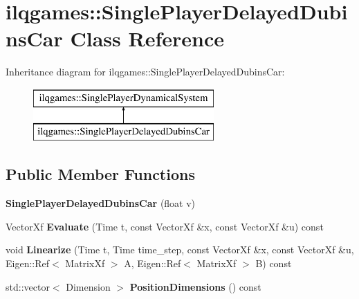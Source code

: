 \hypertarget{classilqgames_1_1_single_player_delayed_dubins_car}{}\section{ilqgames\+:\+:Single\+Player\+Delayed\+Dubins\+Car Class Reference}
\label{classilqgames_1_1_single_player_delayed_dubins_car}
Inheritance diagram for ilqgames\+:\+:Single\+Player\+Delayed\+Dubins\+Car\+:\begin{figure}[H]
\begin{center}
\leavevmode
\includegraphics[height=2.000000cm]{classilqgames_1_1_single_player_delayed_dubins_car}
\end{center}
\end{figure}
\subsection*{Public Member Functions}
\begin{DoxyCompactItemize}
\item 
{\bfseries Single\+Player\+Delayed\+Dubins\+Car} (float v)\hypertarget{classilqgames_1_1_single_player_delayed_dubins_car_aa6ba6ca3a5e0b6c80d9199e2c12ced47}{}\label{classilqgames_1_1_single_player_delayed_dubins_car_aa6ba6ca3a5e0b6c80d9199e2c12ced47}

\item 
Vector\+Xf {\bfseries Evaluate} (Time t, const Vector\+Xf \&x, const Vector\+Xf \&u) const \hypertarget{classilqgames_1_1_single_player_delayed_dubins_car_a6540f0ba900dfd2e49e920a066646a39}{}\label{classilqgames_1_1_single_player_delayed_dubins_car_a6540f0ba900dfd2e49e920a066646a39}

\item 
void {\bfseries Linearize} (Time t, Time time\+\_\+step, const Vector\+Xf \&x, const Vector\+Xf \&u, Eigen\+::\+Ref$<$ Matrix\+Xf $>$ A, Eigen\+::\+Ref$<$ Matrix\+Xf $>$ B) const \hypertarget{classilqgames_1_1_single_player_delayed_dubins_car_a74f59a5a3ea939832b0fab1c37ee48c8}{}\label{classilqgames_1_1_single_player_delayed_dubins_car_a74f59a5a3ea939832b0fab1c37ee48c8}

\item 
std\+::vector$<$ Dimension $>$ {\bfseries Position\+Dimensions} () const \hypertarget{classilqgames_1_1_single_player_delayed_dubins_car_aa6e368f3b2235bda5adbe5b0e5337c2e}{}\label{classilqgames_1_1_single_player_delayed_dubins_car_aa6e368f3b2235bda5adbe5b0e5337c2e}

\end{DoxyCompactItemize}
